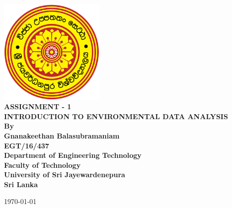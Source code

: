 \documentclass[12pt,a4paper,oneside]{article}
\begin{document}
\begin{titlepage}

\begin{flushright}
\end{flushright}


\center %
{
\includegraphics[width=2in,keepaspectratio]{logo.png}\\[0.5cm]
\fontsize{24pt}{30}\selectfont \textbf{\uppercase{Assignment - 1}}\\[1.5cm]
\fontsize{16}{24}\selectfont \textbf{\uppercase{Introduction to Environmental Data Analysis}}\\[1.5cm]
\fontsize{16pt}{24}\selectfont \textbf{By}\\[0.5cm]
\fontsize{12pt}{12}\selectfont {
}
\vspace*{\fill}
\fontsize{12pt}{12}\selectfont \textbf { Gnanakeethan Balasubramaniam \\ EGT/16/437}\\[0.5cm]


\vspace*{\fill}
\fontsize{12pt}{12}\selectfont \textbf {Department of Engineering Technology \\ Faculty of Technology\\University of Sri Jayewardenepura\\ Sri Lanka \\ }
\vspace*{\fill}

\today
}


\end{titlepage}
\end{document}
